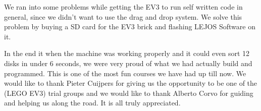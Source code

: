 We ran into some problems while getting the EV3 to run self written code in general, since we didn't want to use the drag and drop system. We solve this problem by buying a SD card for the EV3 brick and flashing LEJOS Software on it.

In the end it when the machine was working properly and it could even sort 12 disks in under 6 seconds, we were very proud of what we had actually build and programmed. This is one of the most fun courses we have had up till now. We would like to thank Pieter Cuijpers for giving us the opportunity to be one of the (LEGO EV3) trial groups and we would like to thank Alberto Corvo for guiding and helping us along the road. It is all truly appreciated. 




